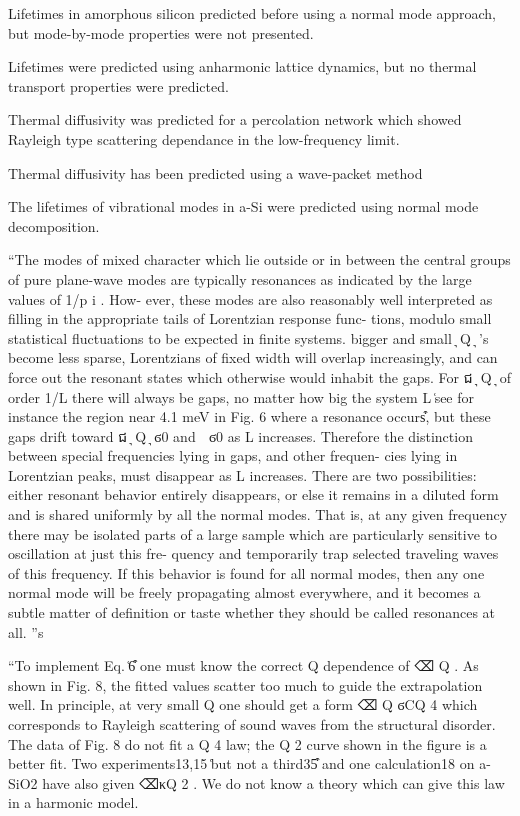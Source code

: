 \documentclass[aps,prb,twocolumn,superscriptaddress,footinbib,amsmath,amssymb,floatfix]{revtex4}
\begin{document}
Lifetimes in amorphous silicon predicted before using a normal mode 
approach, but mode-by-mode properties were not presented.
\cite{bickham_calculation_1998}

Lifetimes were predicted using anharmonic lattice dynamics, but no thermal 
transport properties were predicted.\cite{fabian_anharmonic_1996}

Thermal diffusivity was predicted for a percolation network which showed 
Rayleigh type scattering dependance in the low-frequency limit.
\cite{sheng_heat_1991}

Thermal diffusivity has been predicted using a wave-packet method

The lifetimes of vibrational modes in a-Si were predicted using normal 
mode decomposition.\cite{he_heat_2011}

``The
modes of mixed character which lie outside or in between
the central groups of pure plane-wave modes are typically
resonances as indicated by the large values of 1/p i .
How-
ever, these modes are also reasonably well interpreted as
filling in the appropriate tails of Lorentzian response func-
tions, modulo small statistical fluctuations to be expected in
finite systems.
bigger and small ͉ Q ͉ ’s become less sparse, Lorentzians of
fixed width will overlap increasingly, and can force out the
resonant states which otherwise would inhabit the gaps. For
ជ
͉ Q ͉ of order 1/L there will always be gaps, no matter how
big the system L ͑see for instance the region near 4.1 meV in
Fig. 6 where a resonance occurs͒, but these gaps drift toward
ជ
͉ Q ͉ ϭ0 and ␻ ϭ0 as L increases. Therefore the distinction
between special frequencies lying in gaps, and other frequen-
cies lying in Lorentzian peaks, must disappear as L increases.
There are two possibilities: either resonant behavior entirely
disappears, or else it remains in a diluted form and is shared
uniformly by all the normal modes. That is, at any given
frequency there may be isolated parts of a large sample
which are particularly sensitive to oscillation at just this fre-
quency and temporarily trap selected traveling waves of this
frequency. If this behavior is found for all normal modes,
then any one normal mode will be freely propagating almost
everywhere, and it becomes a subtle matter of definition or
taste whether they should be called resonances at all.
''s



``To implement Eq. ͑6͒ one must know the
correct Q dependence of ⌫ Q . As shown in Fig. 8, the fitted
values scatter too much to guide the extrapolation well. In
principle, at very small Q one should get a form ⌫ Q ϭCQ 4
which corresponds to Rayleigh scattering of sound waves
from the structural disorder. The data of Fig. 8 do not fit a
Q 4 law; the Q 2 curve shown in the figure is a better fit. Two
experiments13,15 ͑but not a third35͒ and one calculation18 on
a-SiO2 have also given ⌫κQ 2 . We do not know a theory
which can give this law in a harmonic model.
\end{document}
